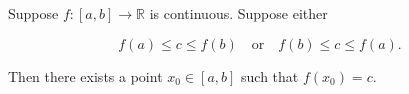 Suppose $f: [a, b] \to \mathbb{R}$ is continuous. Suppose either

$$f(a) \leq c \leq f(b) \quad \text{or} \quad f(b) \leq c \leq f(a).$$

Then there exists a point $x_0 \in [a, b]$ such that $f(x_0) = c$.

